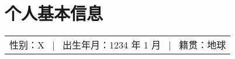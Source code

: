 \section*{个人基本信息}

\begin{tabular}{p{\textwidth}}
性别：X \, | \, 出生年月：1234 年 1 月 \, | \, 籍贯：地球
\end{tabular}